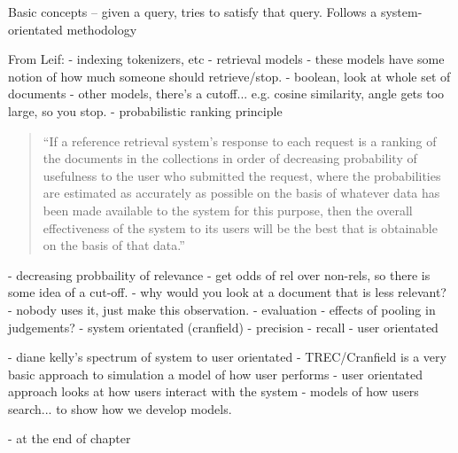 Basic concepts -- given a query, tries to satisfy that query.
Follows a system-orientated methodology

From Leif:
- indexing
    tokenizers, etc
- retrieval models
    - these models have some notion of how much someone should retrieve/stop.
    - boolean, look at whole set of documents
    - other models, there's a cutoff... e.g. cosine similarity, angle gets too large, so you stop.
    - probabilistic ranking principle
    
        \begin{quote}
            ``If a reference retrieval system's response to each request is a ranking of the documents in the collections in order of decreasing probability of usefulness to the user who submitted the request, where the probabilities are estimated as accurately as possible on the basis of whatever data has been made available to the system for this purpose, then the overall effectiveness of the system to its users will be the best that is obtainable on the basis of that data.''
        \end{quote}
    
    
        - decreasing probbaility of relevance
        - get odds of rel over non-rels, so there is some idea of a cut-off.
        - why would you look at a document that is less relevant?
        - nobody uses it, just make this observation.
- evaluation
    - effects of pooling in judgements?
    - system orientated (cranfield)
        - precision
        - recall
    - user orientated
    
    - diane kelly's spectrum of system to user orientated
        - TREC/Cranfield is a very basic approach to simulation
            a model of how user performs
        - user orientated approach looks at how users interact with the system
        - models of how users search... to show how we develop models.
        
        - at the end of chapter

